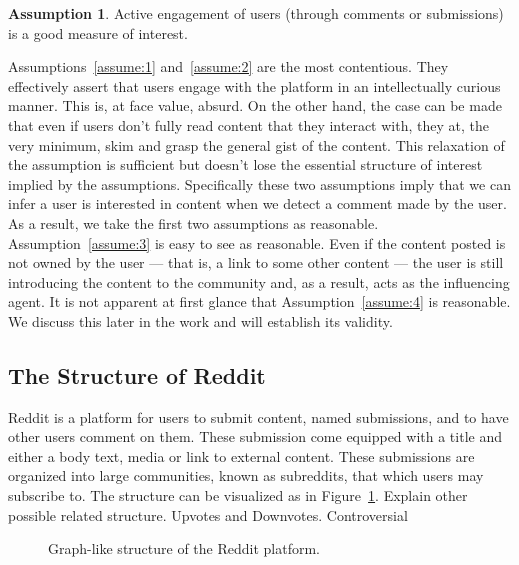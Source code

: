 \documentclass[letterpaper, 10 pt, conference]{ieeeconf}
\theoremstyle{definition}
\newtheorem{assumption}{Assumption}[section]
\newcommand{\red}{\color{red}}
\begin{document}
\begin{assumption}
  Active engagement of users (through comments or submissions) is a good measure of interest.
  \label{assume:5}
\end{assumption}

Assumptions~\ref{assume:1} and~\ref{assume:2} are the most contentious. They effectively assert that users engage with the platform in an intellectually curious manner. This is, at face value, absurd. On the other hand, the case can be made that even if users don't fully read content that they interact with, they at, the very minimum, skim and grasp the general gist of the content. This relaxation of the assumption is sufficient but doesn't lose the essential structure of interest implied by the assumptions. Specifically these two assumptions imply that we can infer a user is interested in content when we detect a comment made by the user. As a result, we take the first two assumptions as reasonable. Assumption~\ref{assume:3} is easy to see as reasonable. Even if the content posted is not owned by the user --- that is, a link to some other content --- the user is still introducing the content to the community and, as a result, acts as the influencing agent. It is not apparent at first glance that Assumption~\ref{assume:4} is reasonable. We discuss this later in the work and will establish its validity.

\subsection{The Structure of Reddit}
Reddit is a platform for users to submit content, named submissions, and to have other users comment on them. These submission come equipped with a title and either a body text, media or link to external content. These submissions are organized into large communities, known as subreddits, that which users may subscribe to. The structure can be visualized as in Figure~\ref{fig:model:reddit}.
{\red Explain other possible related structure. Upvotes and Downvotes. Controversial}

\begin{figure}
  \centering
  \caption{Graph-like structure of the Reddit platform.}
  \label{fig:model:reddit}
\end{figure}
\end{document}
